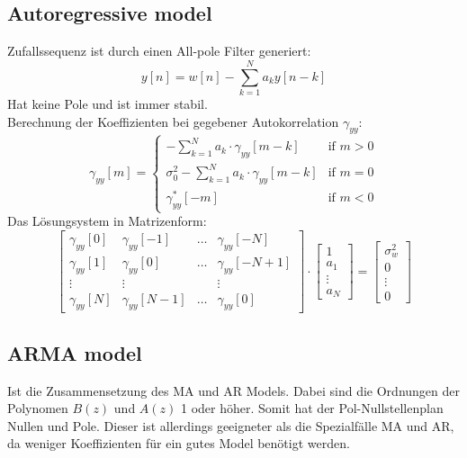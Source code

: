 \subsection{Autoregressive model}
Zufallssequenz ist durch einen All-pole Filter generiert:
\[ y[n] = w[n] - \sum_{k=1}^{N}a_ky[n-k] \]
Hat keine Pole und ist immer stabil.\\
Berechnung der Koeffizienten bei gegebener Autokorrelation $\gamma_{yy}$:
\[ \gamma_{yy}[m] = \left\lbrace \begin{matrix}
	-\sum_{k=1}^{N}a_k\cdot\gamma_{yy}[m-k] & \textrm{if } m>0\\
	\sigma_0^2-\sum_{k=1}^{N}a_k\cdot\gamma_{yy}[m-k] & \textrm{if } m =0\\
	\gamma_{yy}^*[-m]	& \textrm{if } m < 0
\end{matrix}\right. \]
Das Lösungsystem in Matrizenform:
\[ \begin{bmatrix}
	\gamma_{yy}[0] & \gamma_{yy}[-1] & \ldots & \gamma_{yy}[-N]\\
	\gamma_{yy}[1] & \gamma_{yy}[0] & \ldots & \gamma_{yy}[-N+1]\\
	\vdots & \vdots & & \vdots\\
	\gamma_{yy}[N] & \gamma_{yy}[N-1] & \ldots & \gamma_{yy}[0]
\end{bmatrix} \cdot \begin{bmatrix}
	1 \\ a_1 \\ \vdots \\ a_N \end{bmatrix} = \begin{bmatrix}
	\sigma_w^2 \\ 0 \\ \vdots \\ 0 \end{bmatrix} \]  
	
\subsection{ARMA model}
Ist die Zusammensetzung des MA und AR Models. Dabei sind die Ordnungen der
Polynomen $B(z)$ und $A(z)$ 1 oder höher. Somit hat der Pol-Nullstellenplan
Nullen und Pole. Dieser ist allerdings geeigneter als die Spezialfälle MA und
AR, da weniger Koeffizienten für ein gutes Model benötigt werden.